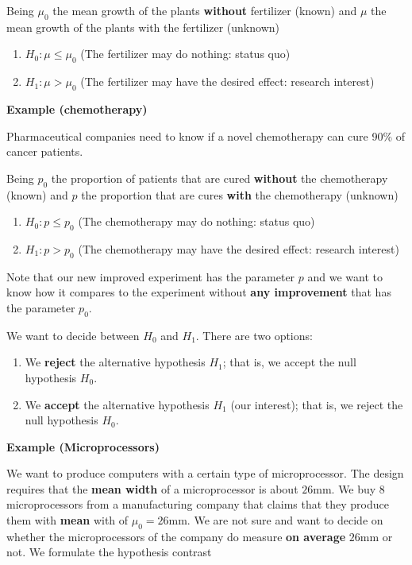 \documentclass[
]{book}
\providecommand{\tightlist}{%
  \setlength{\itemsep}{0pt}\setlength{\parskip}{0pt}}
\begin{document}
Being \(\mu_0\) the mean growth of the plants \textbf{without} fertilizer (known) and \(\mu\) the mean growth of the plants with the fertilizer (unknown)

\begin{enumerate}
\def\labelenumi{\alph{enumi}.}
\tightlist
\item
  \(H_0:\mu \leq \mu_0\) (The fertilizer may do nothing: status quo)
\item
  \(H_1:\mu > \mu_0\) (The fertilizer may have the desired effect: research interest)
\end{enumerate}

\textbf{Example (chemotherapy)}

Pharmaceutical companies need to know if a novel chemotherapy can cure 90\% of cancer patients.

Being \(p_0\) the proportion of patients that are cured \textbf{without} the chemotherapy (known) and \(p\) the proportion that are cures \textbf{with} the chemotherapy (unknown)

\begin{enumerate}
\def\labelenumi{\alph{enumi}.}
\tightlist
\item
  \(H_0:p \leq p_0\) (The chemotherapy may do nothing: status quo)
\item
  \(H_1: p > p_0\) (The chemotherapy may have the desired effect: research interest)
\end{enumerate}

Note that our new improved experiment has the parameter \(p\) and we want to know how it compares to the experiment without \textbf{any improvement} that has the parameter \(p_0\).

We want to decide between \(H_0\) and \(H_1\). There are two options:

\begin{enumerate}
\def\labelenumi{\arabic{enumi}.}
\item
  We \textbf{reject} the alternative hypothesis \(H_1\); that is, we accept the null hypothesis \(H_0\).
\item
  We \textbf{accept} the alternative hypothesis \(H_1\) (our interest); that is, we reject the null hypothesis \(H_0\).
\end{enumerate}

\textbf{Example (Microprocessors)}

We want to produce computers with a certain type of microprocessor. The design requires that the \textbf{mean width} of a microprocessor is about \(26\)mm. We buy \(8\) microprocessors from a manufacturing company that claims that they produce them with \textbf{mean} with of \(\mu_0=26\)mm. We are not sure and want to decide on whether the microprocessors of the company do measure \textbf{on average} \(26\)mm or not. We formulate the hypothesis contrast
\end{document}
